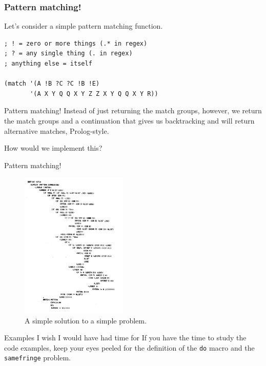 \documentclass[aspectratio=169]{beamer}
\begin{document}
  \begin{frame}[fragile]
    \frametitle{Pattern matching!}
    Let’s consider a simple pattern matching function.
    \begin{listing}[H]
      \caption{A simple pattern matcher.}
      \begin{verbatim}
; ! = zero or more things (.* in regex)
; ? = any single thing (. in regex)
; anything else = itself

(match '(A !B ?C ?C !B !E)
       '(A X Y Q Q X Y Z Z X Y Q Q X Y R))
      \end{verbatim}
    \end{listing}
  \end{frame}
  \begin{frame}{Pattern matching!}
    Instead of just returning the match groups, however, we return the match
    groups and a continuation that gives us backtracking and will return
    alternative matches, Prolog-style.

    \bigskip

    How would we implement this?
  \end{frame}
  \begin{frame}{Pattern matching!}
    \begin{figure}
      \includegraphics[height=7cm]{match.png}
      \caption{A simple solution to a simple problem.}
    \end{figure}
  \end{frame}
  \begin{frame}{Examples I wish I would have had time for}
    If you have the time to study the code examples, keep your eyes peeled
    for the definition of the \texttt{do} macro and the \texttt{samefringe}
    problem.
  \end{frame}
\end{document}
